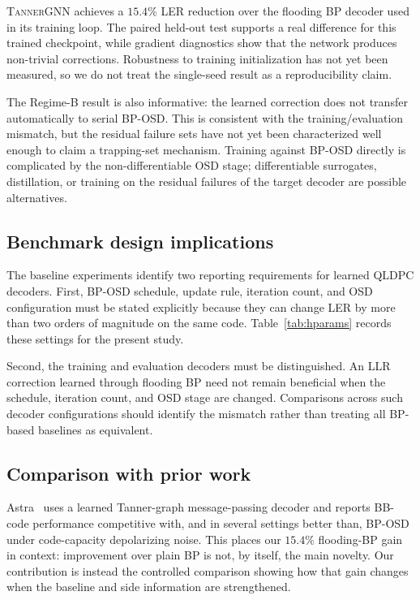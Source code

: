 \documentclass[a4paper,twocolumn,11pt,nopdfoutputerror]{quantumarticle}
\begin{document}
\textsc{TannerGNN} achieves a $15.4\%$ LER reduction over the flooding
BP decoder used in its training loop. The paired held-out test supports a
real difference for this trained checkpoint, while gradient diagnostics
show that the network produces non-trivial corrections. Robustness to
training initialization has not yet been measured, so we do not treat the
single-seed result as a reproducibility claim.

The Regime-B result is also informative: the learned correction does
not transfer automatically to serial BP-OSD. This is consistent with the
training/evaluation mismatch, but the residual failure sets have not yet
been characterized well enough to claim a trapping-set mechanism.
Training against BP-OSD directly is complicated by the non-differentiable
OSD stage; differentiable surrogates, distillation, or training on the
residual failures of the target decoder are possible alternatives.

\subsection{Benchmark design implications}

The baseline experiments identify two reporting requirements for learned
QLDPC decoders. First, BP-OSD schedule, update rule, iteration count, and
OSD configuration must be stated explicitly because they can change LER
by more than two orders of magnitude on the same code. Table~\ref{tab:hparams}
records these settings for the present study.

Second, the training and evaluation decoders must be distinguished. An
LLR correction learned through flooding BP need not remain beneficial
when the schedule, iteration count, and OSD stage are changed. Comparisons
across such decoder configurations should identify the mismatch rather
than treating all BP-based baselines as equivalent.

\subsection{Comparison with prior work}\label{sec:priorwork}

Astra~\cite{Maan2025MLBP} uses a learned Tanner-graph message-passing
decoder and reports BB-code performance competitive with, and in several
settings better than, BP-OSD under code-capacity depolarizing noise. This
places our $15.4\%$ flooding-BP gain in context: improvement over plain BP
is not, by itself, the main novelty. Our contribution is instead the
controlled comparison showing how that gain changes when the baseline
and side information are strengthened.
\end{document}
